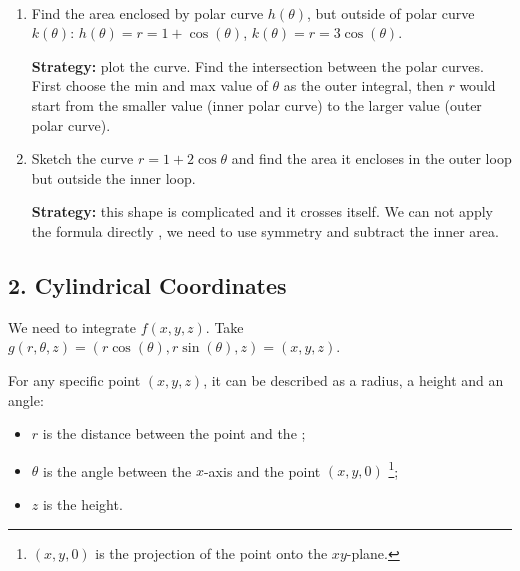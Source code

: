 \begin{exercise}
$\text{ }$

    \begin{enumerate}[label=\alph*)]
        \item Find the area enclosed by polar curve $h(\theta)$, but outside of polar curve $k(\theta)$: $h(\theta) = r = 1 + \cos(\theta)$, $k(\theta) = r = 3\cos(\theta)$. 

        \textbf{Strategy: } plot the curve. Find the intersection between the polar curves. First choose the min and max value of $\theta$ as the outer integral, then $r$ would start from the smaller value (inner polar curve) to the larger value (outer polar curve).

        \item Sketch the curve $r = 1 + 2\cos{\theta}$ and find the area it encloses in the outer loop but outside the inner loop.

        \textbf{Strategy: } this shape is complicated and it crosses itself. We can not apply the formula directly , we need to use symmetry and subtract the inner area.
    \end{enumerate}
\end{exercise}

\subsection*{2. Cylindrical Coordinates}

We need to integrate $f(x, y, z)$. Take $g(r, \theta, z) = (r\cos(\theta), r\sin(\theta), z) = (x,y,z)$. 

For any specific point $(x, y, z)$, it can be described as a radius, a height and an angle:

\begin{center}
\end{center}

\begin{itemize}
    \item $r$ is the distance between the point and the ;
    \item $\theta$ is the angle between the $x$-axis and the point $(x,y,0)$ \footnote{$(x,y,0)$ is the projection of the point onto the $xy$-plane. };
    \item $z$ is the height.
\end{itemize}

